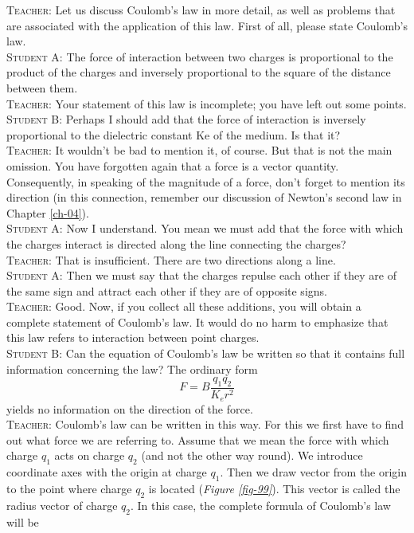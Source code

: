 \documentclass[a4paper,sfsidenotes]{tufte-book}
\begin{document}
\textsc{Teacher:} Let us discuss Coulomb's law in more detail, as well as problems that are associated with the application of this law. First of all, please state Coulomb's law.
\\
\textsc{Student A:} The force of interaction between two charges is proportional to the product of the charges and inversely proportional to the square of the distance between them.
\\
\textsc{Teacher:} Your statement of this law is incomplete; you have left out some points.
\\
\textsc{Student B:} Perhaps I should add that the force of interaction is inversely proportional to the dielectric constant Ke of the medium. Is that it?
\\
\textsc{Teacher:} It wouldn't be bad to mention it, of course. But that is not the main omission. You have forgotten again that a force is a vector quantity. Consequently, in speaking of the magnitude of a force, don't forget to mention its direction (in this connection, remember our discussion of Newton's second law in Chapter \ref{ch-04}).
\\
\textsc{Student A:} Now I understand. You mean we must add that the force with which the charges interact is directed along the line connecting the charges?
\\
\textsc{Teacher:} That is insufficient. There are two directions along a line.
\\
\textsc{Student A:} Then we must say that the charges repulse each other if they are of the same sign and attract each other if they are of opposite signs.
\\
\textsc{Teacher:} Good. Now, if you collect all these additions, you will obtain a complete statement of Coulomb's law. It would do no harm to emphasize that this law refers to interaction between point charges.
\\
\textsc{Student B:} Can the equation of Coulomb's law be written so that it contains full information concerning the law? The ordinary form
\begin{equation}%
F = B \frac{q_{1}q_{2}}{K_{e}r^{2}}
\label{eq-157}
\end{equation}
yields no information on the direction of the force.
\\
\textsc{Teacher:} Coulomb's law can be written in this way. For this we first have to find out what force we are referring to. Assume that we mean the force with which charge $q_{1}$ acts on charge $q_{2}$ (and not the other way round). We introduce coordinate axes with the origin at charge $q_{1}$. Then we draw vector from the origin to the point where charge $q_{2}$ is located (\emph{Figure \ref{fig-99}}). This vector is called the radius vector of charge $q_{2}$. In this case, the complete formula of Coulomb's law will be
\end{document}
